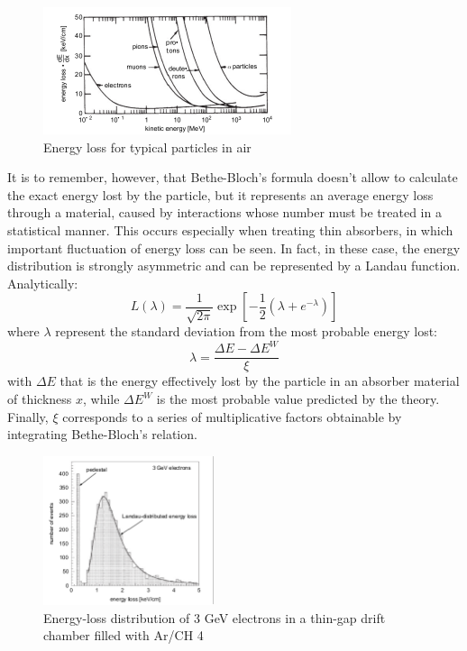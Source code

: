 \documentclass[a4paper,11pt]{book}
\begin{document}
\begin{figure}[hbtp]
\centering
\includegraphics[scale=2]{pictures/particle_energy_loss_in_air.pdf}
\caption{Energy loss for typical particles in air}
\label{fig:energy_loss_in_air}
\end{figure}

It is to remember, however, that Bethe-Bloch's formula doesn't allow to calculate the exact energy lost by the particle, but it represents an average energy loss through a material, caused by interactions whose number must be treated in a statistical manner. This occurs especially when treating thin absorbers, in which important fluctuation of energy loss can be seen. In fact, in these case, the energy distribution is strongly asymmetric and can be represented by a Landau function.\\
Analytically:
\begin{equation}
\label{eq:landau}
L(\lambda) = \frac{1}{\sqrt{2\pi}}\exp\left[-\frac{1}{2}(\lambda+e^{-\lambda})\right]
\end{equation}
where $\lambda$ represent the standard deviation from the most probable energy lost:
\[ \lambda = \frac{\Delta E - \Delta E^W}{\xi} \]
with $\Delta E$ that is the energy effectively lost by the particle in an absorber material of thickness $x$, while $\Delta E^W$ is the most probable value predicted by the theory. Finally, $\xi$ corresponds to a series of multiplicative factors obtainable by integrating Bethe-Bloch's relation.\\

\begin{figure}[hbtp]
\centering
\includegraphics[width=5cm]{pictures/landau.pdf}
\caption{Energy-loss distribution of 3 GeV electrons in a thin-gap drift chamber
filled with Ar/CH 4}
\label{fig:landau_distribution}
\end{figure}
\end{document}
